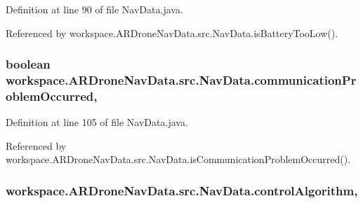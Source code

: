 Definition at line 90 of file Nav\+Data.\+java.



Referenced by workspace.\+A\+R\+Drone\+Nav\+Data.\+src.\+Nav\+Data.\+is\+Battery\+Too\+Low().

\hypertarget{classworkspace_1_1_a_r_drone_nav_data_1_1src_1_1_nav_data_a3058a8d0e7ba0855bcca2f674ad59fe5}{}
\subsubsection[{communication\+Problem\+Occurred}]{\setlength{\rightskip}{0pt plus 5cm}boolean workspace.\+A\+R\+Drone\+Nav\+Data.\+src.\+Nav\+Data.\+communication\+Problem\+Occurred\hspace{0.3cm}{\ttfamily [static]}, {\ttfamily [protected]}}\label{classworkspace_1_1_a_r_drone_nav_data_1_1src_1_1_nav_data_a3058a8d0e7ba0855bcca2f674ad59fe5}


Definition at line 105 of file Nav\+Data.\+java.



Referenced by workspace.\+A\+R\+Drone\+Nav\+Data.\+src.\+Nav\+Data.\+is\+Communication\+Problem\+Occurred().

\hypertarget{classworkspace_1_1_a_r_drone_nav_data_1_1src_1_1_nav_data_a8210edb20315ce66a16f616b8bf9f5db}{}
\subsubsection[{control\+Algorithm}]{ workspace.\+A\+R\+Drone\+Nav\+Data.\+src.\+Nav\+Data.\+control\+Algorithm\hspace{0.3cm}{\ttfamily [static]}, {\ttfamily [protected]}}\label{classworkspace_1_1_a_r_drone_nav_data_1_1src_1_1_nav_data_a8210edb20315ce66a16f616b8bf9f5db}


